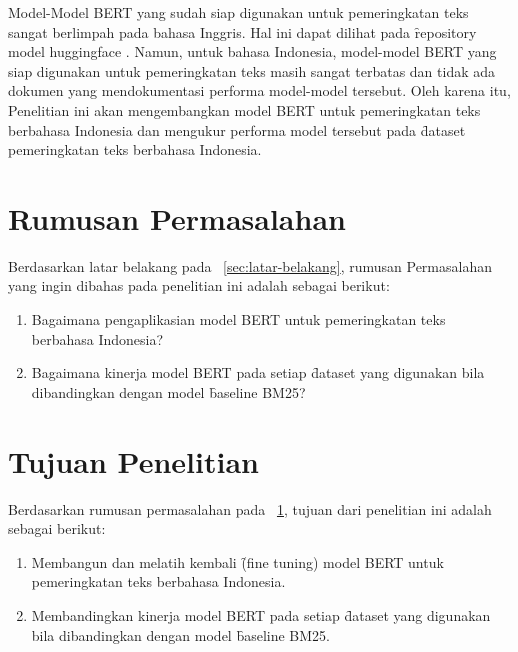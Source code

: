 Model-Model BERT yang sudah siap digunakan untuk pemeringkatan teks sangat berlimpah pada bahasa Inggris. Hal ini dapat dilihat pada \f{repository} model huggingface \href{https://huggingface.co/sentence-transformers}{}. Namun, untuk bahasa Indonesia, model-model BERT yang siap digunakan untuk pemeringkatan teks masih sangat terbatas dan tidak ada dokumen yang mendokumentasi performa model-model tersebut. Oleh karena itu, Penelitian ini akan mengembangkan model BERT untuk pemeringkatan teks berbahasa Indonesia dan mengukur performa model tersebut pada \f{dataset} pemeringkatan teks berbahasa Indonesia.

\section{Rumusan Permasalahan}
\label{sec:rumusan-permasalahan}
Berdasarkan  latar belakang pada \sect~\ref{sec:latar-belakang}, rumusan Permasalahan yang ingin dibahas pada penelitian ini adalah sebagai berikut:
\begin{enumerate}
	\item Bagaimana pengaplikasian model BERT untuk pemeringkatan teks berbahasa Indonesia?
	\item Bagaimana kinerja model BERT pada setiap \f{dataset} yang digunakan bila dibandingkan dengan model \f{baseline} BM25?
\end{enumerate}

\section{Tujuan Penelitian}
Berdasarkan rumusan permasalahan pada \sect~\ref{sec:rumusan-permasalahan}, tujuan dari penelitian ini adalah sebagai berikut:
\begin{enumerate}
	\item Membangun dan melatih kembali \f{(fine tuning)} model BERT untuk pemeringkatan teks berbahasa Indonesia.
	\item Membandingkan kinerja model BERT pada setiap \f{dataset} yang digunakan bila dibandingkan dengan model \f{baseline} BM25.
\end{enumerate}

